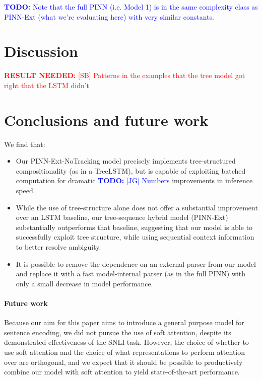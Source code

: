 \documentclass[11pt,letterpaper]{article}
\newcommand\todo[1]{\textcolor{blue}{\textbf{TODO:} #1}}
\newcommand\result[1]{\textcolor{red}{\textbf{RESULT NEEDED:} #1}}
\begin{document}
\todo{Note that the full PINN (i.e. Model 1) is in the same complexity class as PINN-Ext (what we're evaluating here) with very similar constants.}

\vspace{10em}

\section{Discussion}

\result{[SB] Patterns in the examples that the tree model got right that the LSTM didn't}

\vspace{10em}

\section{Conclusions and future work}

We find that:
\begin{itemize}
\item Our PINN-Ext-NoTracking model precisely implements tree-structured compositionality (as in a TreeLSTM), but is capable of exploiting batched computation for dramatic \todo{[JG] Numbers} improvements in inference speed.
\item While the use of tree-structure alone does not offer a substantial improvement over an LSTM baseline, our tree-sequence hybrid model (PINN-Ext) substantially outperforms that baseline, suggesting that our model is able to successfully exploit tree structure, while using sequential context information to better resolve ambiguity.
\item It is possible to remove the dependence on an external parser from our model and replace it with a fast model-internal parser (as in the full PINN) with only a small decrease in model performance.
\end{itemize}

\paragraph{Future work} Because our aim for this paper aims to introduce a general purpose model for sentence encoding, we did not pursue the use of soft attention, despite its demonstrated effectiveness of the SNLI task. However, the choice of whether to use soft attention and the choice of what representations to perform attention over are orthogonal, and we expect that it should be possible to productively combine our model with soft attention to yield state-of-the-art performance.
\end{document}
